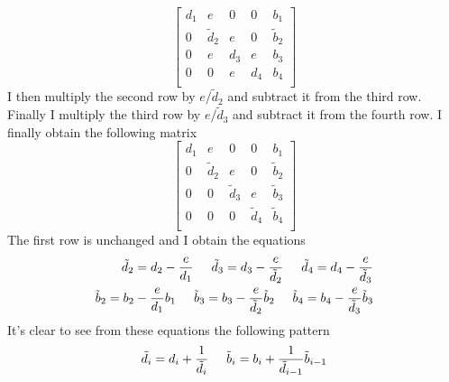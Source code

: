 \documentclass[11pt,a4wide]{article}
\begin{document}
\begin{equation}
\left[\begin{array}{cccc|c}
                           d_1& e& 0& 0& b_1\\ 
                           0& \tilde{d}_2& e& 0& \tilde{b}_2\\
                           0& e& d_3& e& b_3\\
                           0& 0& e& d_4& b_4\\
                      \end{array} \right]
\end{equation}
I then multiply the second row by $e/\tilde{d}_2$ and subtract it from the third row. Finally I multiply
the third row by $e/\tilde{d}_3$ and subtract it from the fourth row. I finally obtain the following matrix
\begin{equation}
\left[\begin{array}{cccc|c}
                           d_1& e& 0& 0& b_1\\ 
                           0& \tilde{d}_2& e& 0& \tilde{b}_2\\
                           0& 0& \tilde{d}_3& e& \tilde{b}_3\\
                           0& 0& 0& \tilde{d}_4& \tilde{b}_4\\
                      \end{array} \right]
\end{equation}
The first row is unchanged and I obtain the equations 
\begin{equation}
\begin{split}
 	\tilde{d}_2 =d_2 - \frac{e}{d_1} \hspace{0.5cm} \tilde{d}_3 =d_3 -\frac{e}{\tilde{d}_2} \hspace{0.5cm} \tilde{d}_4 = d_4 -\frac{e}{\tilde{d}_3} \\
 	\tilde{b}_2 =b_2 -\frac{e}{d_1}b_1 \hspace{0.5cm} \tilde{b}_3 =b_3 -\frac{e}{\tilde{d}_2}\tilde{b}_2 \hspace{0.5cm} \tilde{b}_4 =b_4 -\frac{e}{\tilde{d}_3}\tilde{b}_3
\end{split}
\end{equation}
It's clear to see from these equations the following pattern
\begin{equation}
 	\tilde{d}_i =d_i + \frac{1}{\tilde{d}_i} \hspace{0.5cm}  \tilde{b}_i =b_i +\frac{1}{\tilde{d}_{i-1}}\tilde{b}_{i-1}
\end{equation}
\end{document}
